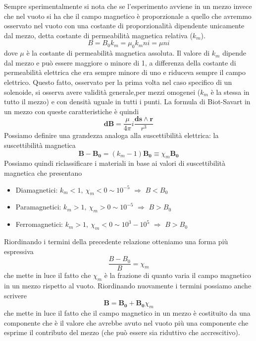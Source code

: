 \documentclass[
10pt, %
a4paper, %
oneside, %
headinclude,footinclude, %
BCOR5mm, %
]{scrartcl}
\begin{document}
Sempre sperimentalmente si nota che se l'esperimento avviene in un mezzo invece che nel vuoto si ha che il campo magnetico è proporzionale a quello che avremmo osservato nel vuoto con una costante di proporzionalità dipendente unicamente dal mezzo, detta costante di permeabilità magnetica relativa (\(k_m\)).
\[B = B_0 k_m = \mu_0 k_m n i = \mu n i\]
dove $\mu$ è la costante di permeabilità magnetica assoluta. 
Il valore di \(k_m\) dipende dal mezzo e può essere maggiore o minore di 1, a differenza della costante di permeabilità elettrica che era sempre minore di uno e riduceva sempre il campo elettrico. Questo fatto, osservato per la prima volta nel caso specifico di un solenoide, si osserva avere validità generale,per mezzi omogenei (\(k_m\) è la stessa in tutto il mezzo) e con densità uguale in tutti i punti. La formula di Biot-Savart in un mezzo con queste caratteristiche è quindi 
\[\mathbf{dB} = \frac{\mu}{4\pi} i \frac{\mathbf{ds}\wedge \mathbf{r}}{r^3}\] 
Possiamo definire una grandezza analoga alla suscettibilità elettrica: la suscettibilità magnetica 
\[\mathbf{B}-\mathbf{B_0}=(k_m - 1)\mathbf{B_0} \equiv \chi_m \mathbf{B_0}\]
Possiamo quindi riclassificare i materiali in base ai valori di suscettibilità magnetica che presentano
\begin{itemize}
	\item Diamagnetici: \(k_m <1,\ \chi_m < 0\sim 10^{-5}\) \(\Rightarrow\) \(B< B_0\)
	\item Paramagnetici: \(k_m >1,\ \chi_m > 0\sim 10^{-5}\) \(\Rightarrow\) \(B > B_0\)
	\item Ferromagnetici: \(k_m >1,\ \chi_m < 0\sim 10^{3}-10^{5}\) \(\Rightarrow\) \(B > B_0\)
\end{itemize}
Riordinando i termini della precedente relazione otteniamo una forma più espressiva
\[\frac{B-B_0}{B}=\chi_m\]
che mette in luce il fatto che $\chi_m$ è la frazione di quanto varia il campo magnetico in un mezzo rispetto al vuoto. Riordinando nuovamente i termini possiamo anche scrivere
\[\mathbf{B}=\mathbf{B_0}+\mathbf{B_0}\chi_m\]
che mette in luce il fatto che il campo magnetico in un mezzo è costituito da una componente che è il valore che avrebbe avuto nel vuoto più una componente che esprime il contributo del mezzo (che può essere sia riduttivo che accrescitivo). 
\end{document}
